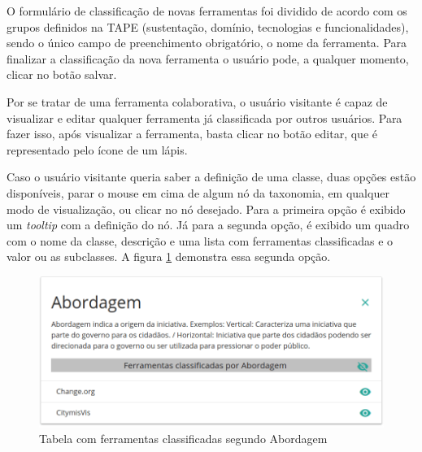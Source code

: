 \par
O formulário de classificação de novas ferramentas foi dividido de acordo com os grupos definidos na TAPE (sustentação, domínio, tecnologias e funcionalidades), sendo o único campo de preenchimento obrigatório, o nome da ferramenta. Para finalizar a classificação da nova ferramenta o usuário pode, a qualquer momento, clicar no botão salvar. 
\par
Por se tratar de uma ferramenta colaborativa, o usuário visitante é capaz de visualizar e editar qualquer ferramenta já classificada por outros usuários. 
Para fazer isso, após visualizar a ferramenta, basta clicar no botão editar, que é representado pelo ícone de um lápis. 

\par
Caso o usuário visitante queria saber a definição de uma classe, duas opções estão disponíveis, parar o mouse em cima de algum nó da taxonomia, em qualquer modo de visualização, 
ou clicar no nó desejado. Para a primeira opção é exibido um \textit{tooltip} com a definição do nó. Já para a segunda opção, é exibido um quadro com o nome da classe, descrição e 
uma lista com ferramentas classificadas e o valor ou as subclasses. A figura \ref{fig:tabela-ferramentas} demonstra essa segunda opção. 

\begin{figure}[!ht]
    \centering
    \includegraphics[scale=0.20]{./figuras/abordagem.png}
    \caption{Tabela com ferramentas classificadas segundo Abordagem}
    \label{fig:tabela-ferramentas}
\end{figure}
\par